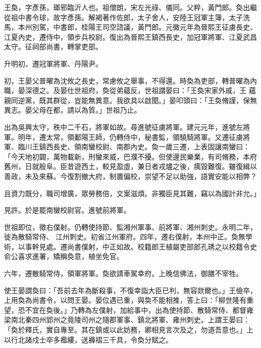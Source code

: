
\begin{pinyinscope}

 王奐，字彥孫，瑯邪臨沂人也。祖僧朗，宋左光祿、儀同。父粹，黃門郎。奐出繼從祖中書令球，故字彥孫。解褐著作佐郎，太子舍人，安陸王冠軍主簿，太子洗馬，本州別駕，中書郎，桂陽王司空諮議，黃門郎。元徽元年為晉熙王征虜長史、江夏內史，遷侍中，領步兵校尉。復出為晉熙王鎮西長史，加冠軍將軍、江夏武昌太守。征祠部尚書，轉掌吏部。



 升明初，遷冠軍將軍、丹陽尹。



 初，王晏父普曜為沈攸之長史，常慮攸之舉事，不得還。時奐為吏部，轉普曜為內職，晏深德之。及晏仕世祖府，奐從弟蘊反，世祖謂晏曰：「王奐宋家外戚，王
 蘊親同逆黨，既其群從，豈能無異意。我欲具以啟聞。」晏叩頭曰：「王奐脩謹，保無異志。晏父母在都，請以為質。」世祖乃止。



 出為吳興太守，秩中二千石，將軍如故。尋進號征虜將軍。建元元年，進號左將軍。明年，遷太常，領鄱陽王師，仍轉侍中，秘書監，領驍騎將軍。又遷征虜將軍、臨川王鎮西長史、領南蠻校尉、南郡內史。奐一歲三遷，上表固讓南蠻曰：「今天地初闢，萬物載新，刑蠻來威，巴濮不擾。但使邊民樂業，有司脩務，本府舊州，日就殷阜。臣昔遊西土，較見盈虛，兼日者戎燼之後，痍毀難復。雖復緝以善政，未及來蘇。今復割撤大府，制置偏校，崇望不足以助強，語實安能以相弊？



 且資力既分，職司增廣，眾勞務倍，文案滋煩。非獨臣見其難，竊以為國計非允。」



 見許。於是罷南蠻校尉官。進號前將軍。



 世祖即位，徵右僕射。仍轉使持節、監湘州軍事、前將軍、湘州刺史。永明二年，徙為散騎常侍、
 江州刺史。初省江州軍府。四年，遷右僕射，本州中正。奐無學術，以事幹見處。遷尚書僕射，中正如故。校籍郎王植屬吏部郎孔琇之以校籍令史俞公喜求進署，矯稱奐意，植坐免官。



 六年，遷散騎常侍，領軍將軍。奐欲請車駕幸府。上晚信佛法，御膳不宰牲。



 使王晏謂奐曰：「吾前去年為斷殺事，不復幸詣大臣已判，無容欻爾也。」王儉卒，上用奐為尚書令，以問王晏。晏位遇已重，與奐不能相推，答上曰：「柳世隆有重望，恐不宜在奐後。」乃轉為左僕射，加給事中，出為使持節、散騎常侍、都督雍梁南北秦四州郢州之竟陵司州之隨郡軍事、鎮北將軍、雍州刺史。上謂王晏曰：「奐於釋氏，實自專至。其在鎮或以此妨務，卿相見言次及之，勿道吾意也。」上以行北諸戍士卒多襤縷，送褲褶三千具，令奐分賦之。




\end{pinyinscope}
